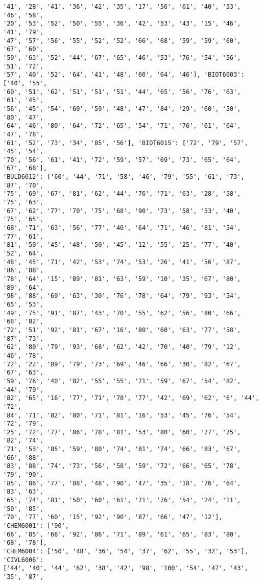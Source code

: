 \documentclass[11pt]{article}
\begin{document}
\begin{Verbatim}[commandchars=\\\{\}]
'41', '28', '41', '36', '42', '35', '17', '56', '61', '40', '53', '46', '58',
'20', '53', '52', '50', '55', '36', '42', '53', '43', '15', '46', '41', '79',
'47', '57', '56', '55', '52', '52', '66', '68', '59', '59', '60', '67', '60',
'59', '63', '52', '44', '67', '65', '46', '53', '76', '54', '56', '51', '72',
'57', '40', '52', '64', '41', '48', '60', '64', '46'], 'BIOT6003': ['40', '55',
'60', '51', '62', '51', '51', '51', '44', '65', '56', '76', '63', '61', '45',
'56', '45', '54', '60', '59', '48', '47', '84', '29', '60', '50', '80', '47',
'64', '46', '80', '64', '72', '65', '54', '71', '76', '61', '64', '47', '78',
'61', '52', '73', '34', '85', '56'], 'BIOT6015': ['72', '79', '57', '45', '54',
'70', '56', '61', '41', '72', '59', '57', '69', '73', '65', '64', '67', '68'],
'BULD6012': ['60', '44', '71', '58', '46', '79', '55', '61', '73', '87', '70',
'75', '69', '67', '81', '62', '44', '76', '71', '63', '28', '58', '75', '63',
'67', '62', '77', '70', '75', '68', '90', '73', '58', '53', '40', '75', '65',
'68', '71', '63', '56', '77', '40', '64', '71', '46', '81', '54', '77', '61',
'81', '50', '45', '48', '50', '45', '12', '55', '25', '77', '40', '52', '64',
'48', '45', '71', '42', '53', '74', '53', '26', '41', '56', '87', '86', '88',
'78', '64', '15', '89', '81', '63', '59', '10', '35', '67', '80', '89', '64',
'98', '88', '69', '63', '30', '76', '78', '64', '79', '93', '54', '65', '53',
'49', '75', '91', '87', '43', '70', '55', '62', '56', '80', '66', '68', '82',
'72', '51', '92', '81', '67', '16', '80', '60', '63', '77', '58', '87', '73',
'62', '80', '79', '93', '68', '62', '42', '70', '40', '79', '12', '46', '78',
'72', '22', '89', '79', '73', '69', '46', '66', '30', '82', '67', '67', '63',
'59', '76', '40', '82', '55', '55', '71', '59', '67', '54', '82', '44', '79',
'82', '65', '16', '77', '71', '78', '77', '42', '69', '62', '6', '44', '72',
'84', '71', '82', '80', '71', '81', '16', '53', '45', '76', '54', '72', '79',
'25', '72', '77', '86', '78', '81', '53', '80', '60', '77', '75', '82', '74',
'71', '53', '85', '59', '80', '74', '81', '74', '66', '83', '67', '66', '88',
'83', '88', '74', '73', '56', '58', '59', '72', '66', '65', '78', '79', '90',
'85', '86', '77', '88', '48', '90', '47', '35', '18', '76', '64', '83', '63',
'65', '74', '81', '50', '60', '61', '71', '76', '54', '24', '11', '50', '85',
'70', '77', '60', '15', '92', '90', '87', '66', '47', '12'], 'CHEM6001': ['90',
'66', '85', '68', '92', '86', '71', '89', '61', '65', '83', '80', '68', '78'],
'CHEM6004': ['50', '48', '36', '54', '37', '62', '55', '32', '53'], 'CIVL6006':
['44', '40', '44', '62', '38', '42', '98', '100', '54', '47', '43', '35', '87',

\end{Verbatim}
\end{document}
